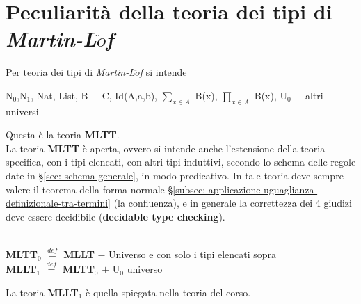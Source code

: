 \section{Peculiarit\`a della teoria dei tipi di \textit{Martin-L$\ddot{o}$f}}
\label{sec:peculiarit\`a-della-teoria-dei-tipi}
Per teoria dei tipi di \textit{Martin-L$\ddot{o}$f} si intende
\begin{center}
N$_0$,N$_1$, Nat, List, B $+$ C, Id(A,a,b), $\sum\limits_{x \in A}$ B(x), $\prod\limits_{x \in A}$ B(x), U$_0$ $+$ altri universi
\end{center}
\noindent
Questa \`e la teoria \textbf{MLTT}.\\
La teoria \textbf{MLTT} \`e aperta, ovvero si intende anche l'estensione della teoria specifica, con i tipi elencati, con altri tipi induttivi, secondo lo schema delle regole date in \S\ref{sec: schema-generale}, in modo predicativo. In tale teoria deve sempre valere il teorema della forma normale \S \ref{subsec: applicazione-uguaglianza-definizionale-tra-termini} (la confluenza), e in generale la correttezza dei 4 giudizi deve essere decidibile (\textbf{decidable type checking}).\\\\
\noindent
\begin{center}\textbf{MLTT$_0$} ${\overset{\mathit{def}}{=}}$ \textbf{MLLT} $-$ Universo e con solo i tipi elencati sopra\\
\textbf{MLLT$_1$} ${\overset{\mathit{def}}{=}}$ \textbf{MLTT$_0$} $+$ U$_0$ universo\end{center}
\noindent
La teoria \textbf{MLLT$_1$} \`e quella spiegata nella teoria del corso.

